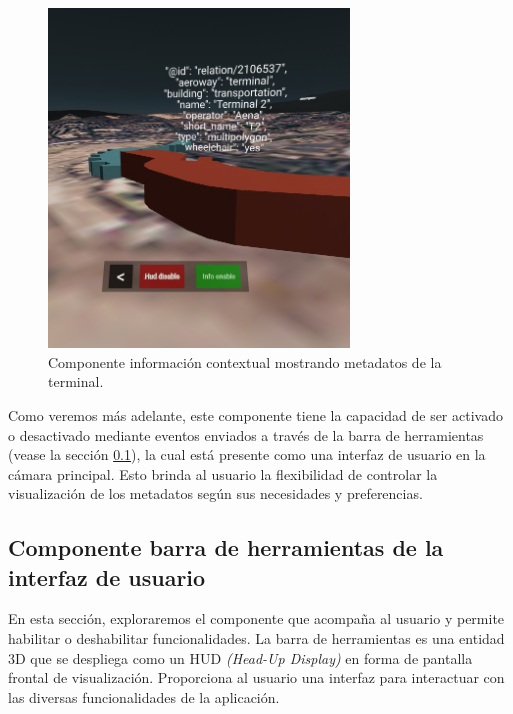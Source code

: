 \documentclass[a4paper, 11pt]{book}
\begin{document}
\begin{figure}[h]
  \centering
  \includegraphics[width=8cm, keepaspectratio]{img/tooltip.jpg}
  \caption{Componente información contextual mostrando metadatos de la terminal.}
  \label{fig:tooltip}
\end{figure}
Como veremos más adelante, este componente tiene la capacidad de ser activado o desactivado mediante eventos enviados a través de la barra de herramientas (vease la sección \ref{subsec:toolbar3d}), la cual está presente como una interfaz de usuario en la cámara principal. Esto brinda al usuario la flexibilidad de controlar la visualización de los metadatos según sus necesidades y preferencias.

\subsection{Componente barra de herramientas de la interfaz de usuario}
\label{subsec:toolbar3d}
En esta sección, exploraremos el componente que acompaña al usuario y permite habilitar o deshabilitar funcionalidades. La barra de herramientas es una entidad 3D que se despliega como un \textsc{\gls{HUD}} \emph{(Head-Up Display)} en forma de pantalla frontal de visualización. Proporciona al usuario una interfaz para interactuar con las diversas funcionalidades de la aplicación.
\end{document}
